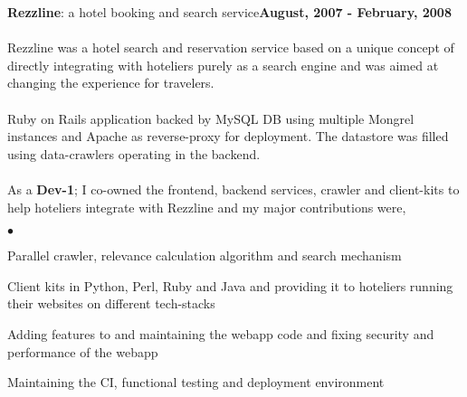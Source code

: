 \documentclass[margin,line]{res}
\newenvironment{list2}{
  \begin{list}{$\bullet$}{%
      \setlength{\itemsep}{0in}
      \setlength{\parsep}{0in} \setlength{\parskip}{0in}
      \setlength{\topsep}{0in} \setlength{\partopsep}{0in} 
      \setlength{\leftmargin}{0.2in}}}{\end{list}}
\begin{document}
\begin{resume}
{\bf Rezzline}: a hotel booking and search service\hfill {\bf August, 2007 - February, 2008}\\
\\
Rezzline was a hotel search and reservation service based on a unique concept of directly integrating with hoteliers purely as a search engine and was aimed at changing the experience for travelers.\\
\\
Ruby on Rails application backed by MySQL DB using multiple Mongrel instances and Apache as reverse-proxy for deployment. The datastore was filled using data-crawlers operating in the backend.\\
\\
As a {\bf Dev-1}; I co-owned the frontend, backend services, crawler and client-kits to help hoteliers integrate with Rezzline and my major contributions were,\\
\begin{list2}
\item Parallel crawler, relevance calculation algorithm and search mechanism
\item Client kits in Python, Perl, Ruby and Java and providing it to hoteliers running their websites on different tech-stacks
\item Adding features to and maintaining the webapp code and fixing security and performance of the webapp
\item Maintaining the CI, functional testing  and deployment environment
\end{list2}


\end{resume}
\end{document}
